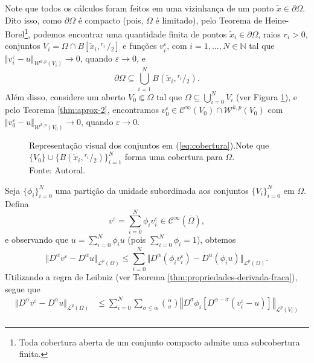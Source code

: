 \documentclass[a4paper, 11pt]{book}
\theoremstyle{definition}
\newcommand{\bN}{\mathbb{N}}
\newcommand{\cC}{\mathcal{C}}
\newcommand{\cL}{\mathcal{L}}
\newcommand{\cW}{\mathcal{W}}
\newcommand{\sfrac}[2]{{}^{#1}\!\!/\!_{#2}}
\begin{document}
\begin{prf}
    Note que todos os cálculos foram feitos em uma vizinhança de um ponto $\tilde x \in \partial\Omega$. Dito isso, como $\partial \Omega$ é compacto (pois, $\Omega$ é limitado), pelo Teorema de Heine-Borel\footnote{Toda cobertura aberta de um conjunto compacto admite uma subcobertura finita.}, podemos encontrar uma quantidade finita de pontos $\tilde x_i \in \partial \Omega$, raios $r_i > 0$, conjuntos $V_i = \Omega \cap B[\tilde x_i,\sfrac{r_i\,}{2}]$ e funções $v_i^\varepsilon$, com $i = 1,\dots,N \in \bN$ tal que $\Vert v_i^\varepsilon - u \Vert_{\cW^{k,p}(V_i)} \to 0$, quando $\varepsilon \to 0$, e 
    \begin{equation} \label{eq:cobertura}
        \partial\Omega \subseteq \bigcup_{i=1}^N B(\tilde x_i, \sfrac{r_i}{2}).
    \end{equation}
    Além disso, considere um aberto $V_0 \Subset \Omega$ tal que $\Omega \subseteq \bigcup_{i=0}^N V_i$ (ver Figura \ref{fig:coberturafronteirav0}), e pelo Teorema \ref{thm:aprox-2}, encontramos $v_0^\varepsilon \in \cC^{\infty}(V_0) \cap \cW^{k,p}(V_0)$ com $\Vert v_0^\varepsilon - u \Vert_{\cW^{k,p}(V_0)} \to 0$, quando $\varepsilon \to 0$.
    \begin{figure}
        \centering
        
        \caption{Representação visual dos conjuntos em (\ref{eq:cobertura}).Note que $\{V_0\} \cup \{B (\tilde x_i, \sfrac{r_i}{2})\}_{i=1}^N$ forma uma cobertura para $\Omega$. \\Fonte: Autoral.}
        \label{fig:coberturafronteirav0}
    \end{figure}
    Seja $\{\phi_i\}_{i=0}^N$ uma partição da unidade subordinada aos conjuntos $\{V_i\}_{i=0}^N$ em $\Omega$.
    Defina
    \[
        v^\varepsilon = \sum_{i=0}^N \phi_i v_i^\varepsilon \in \cC^{\infty}(\overline\Omega),
    \]
    e observando que $u = \sum_{i=0}^N \phi_i u$ (pois $\sum_{i=0}^N \phi_i = 1$), obtemos
    \[
        \Vert D^\alpha v^\varepsilon - D^\alpha u \Vert_{\cL^p(\Omega)} \leqslant \sum_{i=0}^N \Vert D^\alpha (\phi_i v_i^\varepsilon) - D^\alpha(\phi_i u) \Vert_{\cL^p(\Omega)}.
    \]
    Utilizando a regra de Leibniz (ver Teorema \ref{thm:propriedades-derivada-fraca}), segue que
    \[
        \begin{aligned}
            \Vert D^\alpha v^\varepsilon - D^\alpha u \Vert_{\cL^p(\Omega)} &\leqslant \sum_{i=0}^N\sum_{\sigma \leqslant \alpha} \binom{\alpha}{\sigma} \left\Vert  D^{\sigma} \phi_i \left[ D^{\alpha - \sigma} \left( v_i^\varepsilon - u \right) \right] \right\Vert _{\cL^p(V_i)}\\ 

\end{aligned}\]
\end{prf}
\end{document}

